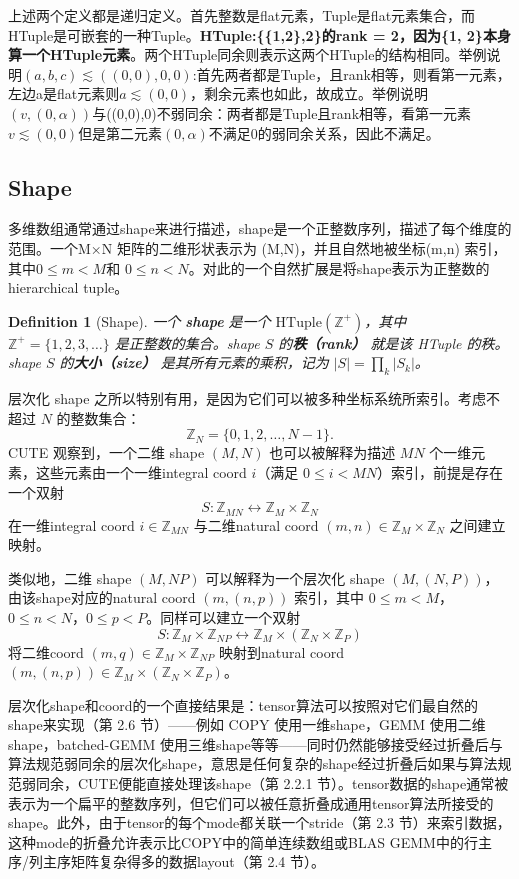 \documentclass{article}
\newtheorem{definition}{Definition}[section]
\begin{document}
\begin{mycomment}
上述两个定义都是递归定义。首先整数是flat元素，Tuple是flat元素集合，而HTuple是可嵌套的一种Tuple。\textbf{HTuple:\{\{1,2\},2\}的rank = 2，因为\{1, 2\}本身算一个HTuple元素}。两个HTuple同余则表示这两个HTuple的结构相同。举例说明$(a,b,c) \lesssim ((0,0),0,0)$:首先两者都是Tuple，且rank相等，则看第一元素，左边a是flat元素则$a \lesssim (0,0)$，剩余元素也如此，故成立。举例说明$(v, (0, \alpha))$与((0,0),0)不弱同余：两者都是Tuple且rank相等，看第一元素$v \lesssim (0,0)$但是第二元素$(0,\alpha)$不满足0的弱同余关系，因此不满足。
\end{mycomment}

\subsection{Shape}
多维数组通常通过shape来进行描述，shape是一个正整数序列，描述了每个维度的范围。一个M×N 矩阵的二维形状表示为 (M,N)，并且自然地被坐标(m,n) 索引，其中$0\leq m < M$和 $0 \leq n < N$。对此的一个自然扩展是将shape表示为正整数的hierarchical tuple。
\begin{definition}[Shape]
一个 \textbf{shape} 是一个 \(\mathrm{HTuple}(\mathbb{Z}^+)\)，其中 \(\mathbb{Z}^+ = \{1, 2, 3, \dots\}\) 是正整数的集合。shape \(S\) 的\textbf{秩（rank）} 就是该 HTuple 的秩。shape \(S\) 的\textbf{大小（size）} 是其所有元素的乘积，记为 \(|S| = \prod_k |S_k|\)。
\end{definition}

层次化 shape 之所以特别有用，是因为它们可以被多种坐标系统所索引。考虑不超过 \(N\) 的整数集合：
\[
\mathbb{Z}_N = \{0, 1, 2, \dots, N-1\}.
\]
CUTE 观察到，一个二维 shape \((M, N)\) 也可以被解释为描述 \(MN\) 个一维元素，这些元素由一个一维integral coord \(i\)（满足 \(0 \leq i < MN\)）索引，前提是存在一个双射
\[
S : \mathbb{Z}_{MN} \leftrightarrow \mathbb{Z}_M \times \mathbb{Z}_N
\]
在一维integral coord \(i \in \mathbb{Z}_{MN}\) 与二维natural coord \((m, n) \in \mathbb{Z}_M \times \mathbb{Z}_N\) 之间建立映射。

类似地，二维 shape \((M, NP)\) 可以解释为一个层次化 shape \((M, (N, P))\)，由该shape对应的natural coord \((m, (n, p))\) 索引，其中 \(0 \leq m < M\)，\(0 \leq n < N\)，\(0 \leq p < P\)。同样可以建立一个双射
\[
S : \mathbb{Z}_M \times \mathbb{Z}_{NP} \leftrightarrow \mathbb{Z}_M \times (\mathbb{Z}_N \times \mathbb{Z}_P)
\]
将二维coord \((m, q) \in \mathbb{Z}_M \times \mathbb{Z}_{NP}\) 映射到natural coord \((m, (n, p)) \in \mathbb{Z}_M \times (\mathbb{Z}_N \times \mathbb{Z}_P)\)。

层次化shape和coord的一个直接结果是：tensor算法可以按照对它们最自然的shape来实现（第 2.6 节）——例如 COPY 使用一维shape，GEMM 使用二维shape，batched-GEMM 使用三维shape等等——同时仍然能够接受经过折叠后与算法规范弱同余的层次化shape，意思是任何复杂的shape经过折叠后如果与算法规范弱同余，CUTE便能直接处理该shape（第 2.2.1 节）。tensor数据的shape通常被表示为一个扁平的整数序列，但它们可以被任意折叠成通用tensor算法所接受的shape。此外，由于tensor的每个mode都关联一个stride（第 2.3 节）来索引数据，这种mode的折叠允许表示比COPY中的简单连续数组或BLAS GEMM中的行主序/列主序矩阵复杂得多的数据layout（第 2.4 节）。
\end{document}
